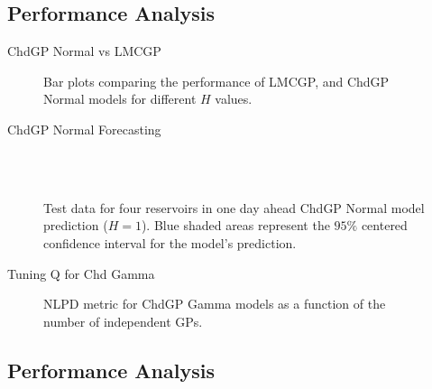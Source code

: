 \subsection{Performance Analysis}
\begin{frame}{ChdGP Normal vs LMCGP}
	\begin{figure}[htbp]
		\centering
		\setlength{}
		\setlength{}
		
		\subfloat[NLPD]{}
		\hfill
		\subfloat[MSLL]{}
		
		\caption{Bar plots comparing the performance of LMCGP, and ChdGP Normal models for different \(H\) values.}
	\end{figure}
\end{frame}

\begin{frame}{ChdGP Normal Forecasting}
	\justifying
	\begin{figure}[htbp]
		\setlength{} 
		\setlength{}
		
		\subfloat[$T.$]{}\hfill
		\subfloat[$A.$]{}\\[-0.5cm]
		\subfloat[$I.$]{}\hfill
		\subfloat[$O.$]{}\\[-0.4cm]
		
		\caption{Test data for four reservoirs in one day ahead ChdGP Normal model prediction ($H=1$). Blue shaded areas represent the $95\%$ centered confidence interval for the model's prediction.}
	\end{figure}
\end{frame}

\begin{frame}{Tuning Q for Chd Gamma}
	\begin{figure}[htbp]
		\centering
		\setlength\figurewidth{\columnwidth} 
		\setlength{}
		
		\caption{NLPD metric for ChdGP Gamma models as a function of the number of independent GPs.}
	\end{figure}
\end{frame}

\subsection{Performance Analysis}

